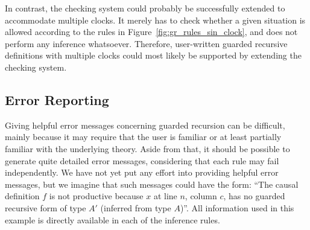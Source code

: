In contrast, the checking system could probably be successfully extended to
accommodate multiple clocks. It merely has to check whether a given situation is
allowed according to the rules in Figure~\ref{fig:gr_rules_sin_clock}, and does
not perform any inference whatsoever. Therefore, user-written guarded recursive
definitions with multiple clocks could most likely be supported by extending the
checking system.

\subsection{Error Reporting}
\label{sec:error-reporting}
Giving helpful error messages concerning guarded recursion can be difficult,
mainly because it may require that the user is familiar or at least partially
familiar with the underlying theory. Aside from that, it should be possible to
generate quite detailed error messages, considering that each rule may fail
independently. We have not yet put any effort into providing helpful error
messages, but we imagine that such messages could have the form: ``The causal
definition $f$ is not productive because $x$ at line $n$, column $c$, has no
guarded recursive form of type $A'$ (inferred from type $A$)''. All information
used in this example is directly available in each of the inference rules.






